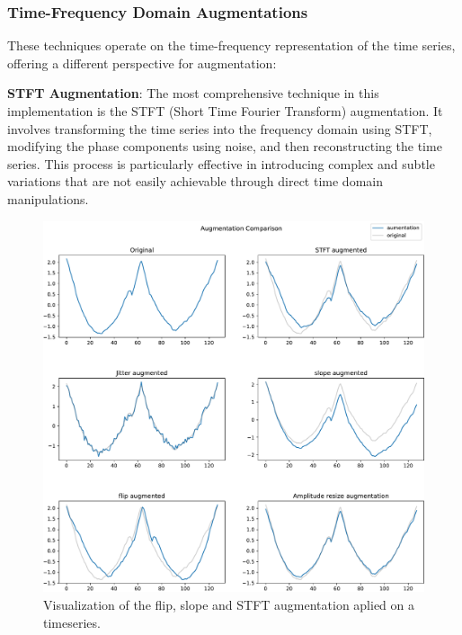\subsubsection*{Time-Frequency Domain Augmentations}
These techniques operate on the time-frequency representation of the time series, offering a different perspective for augmentation:

\textbf{STFT Augmentation}: The most comprehensive technique in this implementation is the STFT (Short Time Fourier Transform) augmentation. It involves transforming the time series into the frequency domain using STFT, modifying the phase components using noise, and then reconstructing the time series. This process is particularly effective in introducing complex and subtle variations that are not easily achievable through direct time domain manipulations.

\begin{figure}
    \centering
    \includegraphics[width=\textwidth]{figures/figure-pdf/Augmentations.pdf}
    \caption{Visualization of the flip, slope and STFT augmentation aplied on a timeseries. }
\end{figure}
